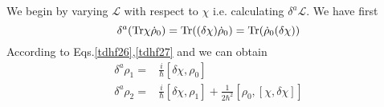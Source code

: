   We begin by varying $\mathscr{L}$ with respect to $\chi$ i.e. calculating $\delta^a\mathscr{L}$. We have first
  \begin{equation}
    \delta^a({\rm Tr}\chi\dot{\rho}_0) = {\rm Tr}((\delta\chi)\dot{\rho}_0) = {\rm Tr}(\dot{\rho}_0(\delta\chi))  \label{tdhf90}
  \end{equation}
  According to Eqs.\eqref{tdhf26},\eqref{tdhf27} and we can obtain
  \begin{subequations}
    \begin{align}
      \label{tdhf91a} \delta^a\rho_1 =& \frac{i}{\hbar}[\delta\chi, \rho_0]\\
      \label{tdhf91b} \delta^a\rho_2 =& \frac{i}{\hbar}[\delta\chi, \rho_1] + \frac{1}{2\hbar^2}[\rho_0,[\chi, \delta\chi]]
    \end{align}
  \end{subequations}
